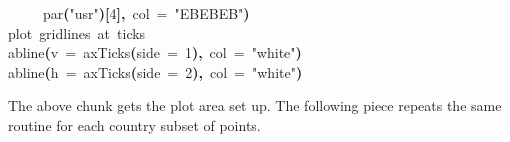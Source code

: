 \documentclass[a4paper]{article}
\newcommand{\hlnumber}[1]{\textcolor[rgb]{0.0823529411764706,0.0784313725490196,0.709803921568627}{#1}}%
\newcommand{\hlfunctioncall}[1]{\textcolor[rgb]{1,0,0}{#1}}%
\newcommand{\hlstring}[1]{\textcolor[rgb]{0.6,0.6,1}{#1}}%
\newcommand{\hlkeyword}[1]{\textcolor[rgb]{0,0,0}{\textbf{#1}}}%
\newcommand{\hlargument}[1]{\textcolor[rgb]{0.694117647058824,0.247058823529412,0.0196078431372549}{#1}}%
\newcommand{\hlcomment}[1]{\textcolor[rgb]{0.8,0.8,0.8}{#1}}%
\newcommand{\hlprompt}[1]{\textcolor[rgb]{0,0,0}{#1}}%
\newcommand{\hlstd}[1]{\textcolor[rgb]{0,0,0}{#1}}%
\newenvironment{Houtput}{\raggedright}{%
%
}
\begin{document}
\begin{Houtput}
\hlstd{}\hlprompt{{\ }}{\ }{\ }{\ }{\ }\hlfunctioncall{par}\hlkeyword{(}\hlstring{"usr"}\hlkeyword{)}\hlkeyword{[}\hlnumber{4}\hlkeyword{]}\hlkeyword{,}{\ }\hlargument{col}{\ }\hlargument{=}{\ }\hlstring{"\usebox{\hlnormalsizeboxhash}EBEBEB"}\hlkeyword{)}\mbox{}
\normalfont
\hspace*{\fill}\\
\hlstd{}\ttfamily\noindent
\hlprompt{\usebox{\hlnormalsizeboxgreaterthan}{\ }}\hlcomment{\usebox{\hlnormalsizeboxhash}{\ }plot{\ }gridlines{\ }at{\ }ticks}\mbox{}
\normalfont
\hspace*{\fill}\\
\hlstd{}\ttfamily\noindent
\hlprompt{\usebox{\hlnormalsizeboxgreaterthan}{\ }}\hlfunctioncall{abline}\hlkeyword{(}\hlargument{v}{\ }\hlargument{=}{\ }\hlfunctioncall{axTicks}\hlkeyword{(}\hlargument{side}{\ }\hlargument{=}{\ }\hlnumber{1}\hlkeyword{)}\hlkeyword{,}{\ }\hlargument{col}{\ }\hlargument{=}{\ }\hlstring{"white"}\hlkeyword{)}\mbox{}
\normalfont
\hspace*{\fill}\\
\hlstd{}\ttfamily\noindent
\hlprompt{\usebox{\hlnormalsizeboxgreaterthan}{\ }}\hlfunctioncall{abline}\hlkeyword{(}\hlargument{h}{\ }\hlargument{=}{\ }\hlfunctioncall{axTicks}\hlkeyword{(}\hlargument{side}{\ }\hlargument{=}{\ }\hlnumber{2}\hlkeyword{)}\hlkeyword{,}{\ }\hlargument{col}{\ }\hlargument{=}{\ }\hlstring{"white"}\hlkeyword{)}\mbox{}
\normalfont
\hspace*{\fill}\\
\hlstd{}
\end{Houtput}

The above chunk gets the plot area set up. The following piece repeats the same routine for each country subset of points.
\end{document}
